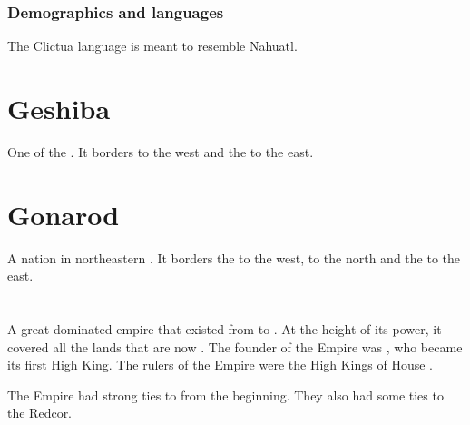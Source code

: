 \subsubsection{Demographics and languages}
The Clictua language is meant to resemble Nahuatl. 















\section{Geshiba}
One of the . 
It borders  to the west and the  to the east. 















\section{Gonarod}
A nation in northeastern \Velcad{}. 
It borders the  to the west,  to the north and the  to the east. 















\section{\GreatVelcad}
\index{\GreatBelkade}
A great dominated empire that existed from  to . 
At the height of its power, it covered all the lands that are now \Velcad{}. 
The founder of the Empire was , who became its first High King. 
The rulers of the Empire were the High Kings of House \Velcad. 

The Empire had strong ties to  from the beginning. 
They also had some ties to the Redcor. 

